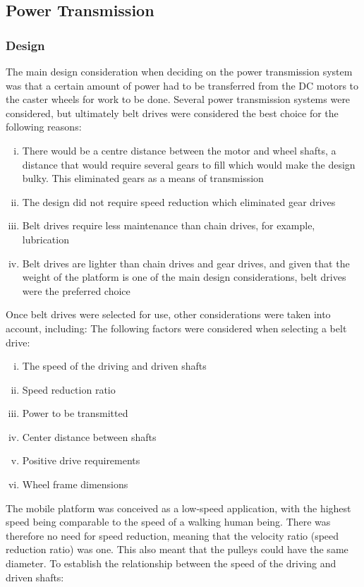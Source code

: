 \subsection{Power Transmission}
\subsubsection{Design}
\label{sec:powerTransmission}
The main design consideration when deciding on the power transmission system was that a certain amount of power had to be transferred from the \ac{DC} motors to the caster wheels for work to be done. Several power transmission systems were considered, but ultimately belt drives were considered the best choice for the following reasons:
\begin{enumerate}[i.]
    \item There would be a centre distance between the motor and wheel shafts, a distance that would require several gears to fill which would make the design bulky. This eliminated gears as a means of transmission
    \item  The design did not require speed reduction which eliminated gear drives
    \item Belt drives require less maintenance than chain drives, for example, lubrication
    \item Belt drives are lighter than chain drives and gear drives, and given that the weight of the platform is one of the main design considerations, belt drives were the preferred choice
\end{enumerate}

Once belt drives were selected for use, other considerations were taken into account, including:
The following factors were considered when selecting a belt drive:
\begin{enumerate}[i.]
    \item The speed of the driving and driven shafts
    \item Speed reduction ratio
    \item Power to be transmitted
    \item Center distance between shafts
    \item Positive drive requirements
    \item Wheel frame dimensions
\end{enumerate}

The mobile platform was conceived as a low-speed application, with the highest speed being comparable to the speed of a walking human being. There was therefore no need for speed reduction,  meaning that the velocity ratio (speed reduction ratio) was one. This also meant that the pulleys could have the same diameter. To establish the relationship between the speed of the driving and driven shafts:

